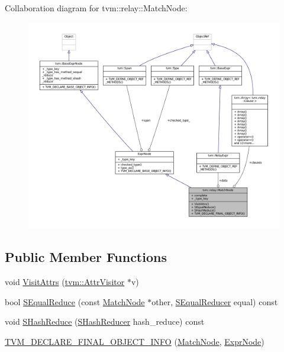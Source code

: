 Collaboration diagram for tvm\+:\+:relay\+:\+:Match\+Node\+:
\nopagebreak
\begin{figure}[H]
\begin{center}
\leavevmode
\includegraphics[width=350pt]{classtvm_1_1relay_1_1MatchNode__coll__graph}
\end{center}
\end{figure}
\subsection*{Public Member Functions}
\begin{DoxyCompactItemize}
\item 
void \hyperlink{classtvm_1_1relay_1_1MatchNode_aa1ad8ab1b8aa92510a76dfdff2085234}{Visit\+Attrs} (\hyperlink{classtvm_1_1AttrVisitor}{tvm\+::\+Attr\+Visitor} $\ast$v)
\item 
bool \hyperlink{classtvm_1_1relay_1_1MatchNode_a87ee538523b1ff28de151f5ca521017f}{S\+Equal\+Reduce} (const \hyperlink{classtvm_1_1relay_1_1MatchNode}{Match\+Node} $\ast$other, \hyperlink{classtvm_1_1SEqualReducer}{S\+Equal\+Reducer} equal) const 
\item 
void \hyperlink{classtvm_1_1relay_1_1MatchNode_a49046df65cc279884e6b3c583278ddff}{S\+Hash\+Reduce} (\hyperlink{classtvm_1_1SHashReducer}{S\+Hash\+Reducer} hash\+\_\+reduce) const 
\item 
\hyperlink{classtvm_1_1relay_1_1MatchNode_a99c2538811c3229576114e345b1a5eb5}{T\+V\+M\+\_\+\+D\+E\+C\+L\+A\+R\+E\+\_\+\+F\+I\+N\+A\+L\+\_\+\+O\+B\+J\+E\+C\+T\+\_\+\+I\+N\+FO} (\hyperlink{classtvm_1_1relay_1_1MatchNode}{Match\+Node}, \hyperlink{namespacetvm_1_1relay_a387f18e050d016c52ea6c4781e7cff6c}{Expr\+Node})
\end{DoxyCompactItemize}
